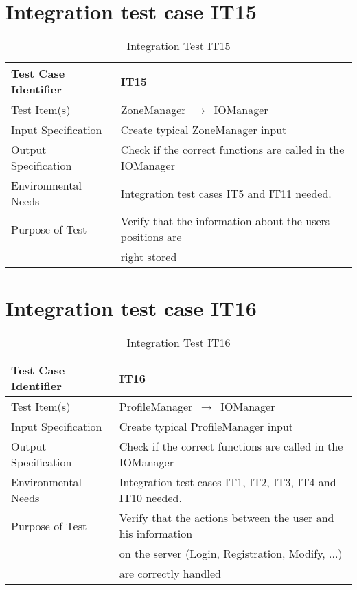 \documentclass[../../testPlan.tex]{subfiles}
\begin{document}
		
		
	\section{Integration test case IT15}
		\begin{table}[H]
			\centering
			\label{IT15}
			\begin{tabular}{ll}
				\hline
				Test Case Identifier & IT15 \\ \hline
				Test Item(s)         & ZoneManager $\,\to\,$ IOManager\\ \hline
				Input Specification  & Create typical ZoneManager input  \\ \hline
				Output Specification & Check if the correct functions are called in the IOManager\\ \hline
				Environmental Needs  &  Integration test cases IT5 and IT11 needed. \\ \hline
				Purpose of Test      &  Verify that the information about the users positions are \\ & right stored  \\ \hline
			\end{tabular}
			\caption{Integration Test IT15}
		\end{table}
	
	
	
	\section{Integration test case IT16}
		\begin{table}[H]
			\centering
			\label{IT16}
			\begin{tabular}{ll}
				\hline
				Test Case Identifier & IT16 \\ \hline
				Test Item(s)         & ProfileManager $\,\to\,$ IOManager\\ \hline
				Input Specification  & Create typical ProfileManager input  \\ \hline
				Output Specification & Check if the correct functions are called in the IOManager\\ \hline
				Environmental Needs  &  Integration test cases IT1, IT2, IT3, IT4 and IT10 needed. \\ \hline
				Purpose of Test      &  Verify that the actions between the user and his information \\ & on the server (Login, Registration, Modify, ...) \\ & are correctly handled  \\ \hline
			\end{tabular}
			\caption{Integration Test IT16}
		\end{table}
		
\end{document}
